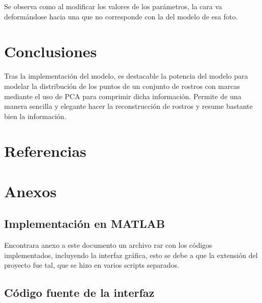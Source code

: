\documentclass[11pt, letterpaper]{article}
\begin{document}
Se observa como al modificar los valores de los parámetros, la cara va deformándose hacia una que no corresponde con la del modelo de esa foto.



\newpage
	
\section{Conclusiones}

Tras la implementación del modelo, es destacable la potencia del modelo para modelar la distribución de los puntos de un conjunto de rostros con marcas mediante el uso de PCA para comprimir dicha información. Permite de una manera sencilla y elegante hacer la reconstrucción de rostros y resume bastante bien la información.
	

\newpage

	
\section{Referencias}  %

\newpage
	
\section{Anexos}	

\subsection{Implementación  en MATLAB}
	
Encontrara anexo a este documento un archivo rar con los códigos implementados, incluyendo la interfaz gráfica, esto se debe a que la extensión del proyecto fue tal, que se hizo en varios scripts separados.	

\newpage

\subsection{Código fuente de la interfaz}
\end{document}
